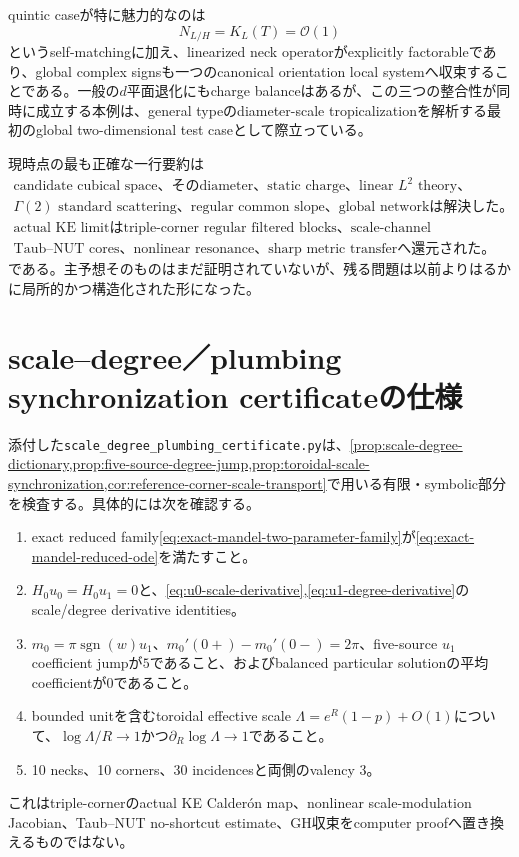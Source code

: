 \documentclass[11pt,a4paper]{ltjsarticle}
\theoremstyle{definition}
\theoremstyle{remark}
\begin{document}
quintic caseが特に魅力的なのは
\[
 N_{L/H}=K_L(T)=\mathcal O(1)
\]
というself-matchingに加え、linearized neck operatorがexplicitly factorableであり、global complex signsも一つのcanonical orientation local systemへ収束することである。一般の$d$平面退化にもcharge balanceはあるが、この三つの整合性が同時に成立する本例は、general typeのdiameter-scale tropicalizationを解析する最初のglobal two-dimensional test caseとして際立っている。

現時点の最も正確な一行要約は
\[
 \boxed{\begin{gathered}
 \text{candidate cubical space、そのdiameter、static charge、linear $L^2$ theory、}\\
 \text{$\Gamma(2)$ standard scattering、regular common slope、global networkは解決した。}\\
 \text{actual KE limitはtriple-corner regular filtered blocks、scale-channel modulation、}\\
 \text{Taub--NUT cores、nonlinear resonance、sharp metric transferへ還元された。}
 \end{gathered}}
\]
である。主予想そのものはまだ証明されていないが、残る問題は以前よりはるかに局所的かつ構造化された形になった。

\appendix

\section{scale--degree／plumbing synchronization certificateの仕様}

添付した\texttt{scale\_degree\_plumbing\_certificate.py}は、\cref{prop:scale-degree-dictionary,prop:five-source-degree-jump,prop:toroidal-scale-synchronization,cor:reference-corner-scale-transport}で用いる有限・symbolic部分を検査する。具体的には次を確認する。
\begin{enumerate}[leftmargin=2.5em]
\item exact reduced family\eqref{eq:exact-mandel-two-parameter-family}が\eqref{eq:exact-mandel-reduced-ode}を満たすこと。
\item $H_0u_0=H_0u_1=0$と、\eqref{eq:u0-scale-derivative},\eqref{eq:u1-degree-derivative}のscale/degree derivative identities。
\item $m_0=\pi\operatorname{sgn}(w)u_1$、$m_0'(0+)-m_0'(0-)=2\pi$、five-source $u_1$ coefficient jumpが$5$であること、およびbalanced particular solutionの平均coefficientが$0$であること。
\item bounded unitを含むtoroidal effective scale $\Lambda=e^R(1-p)+O(1)$について、$\log\Lambda/R\to1$かつ$\partial_R\log\Lambda\to1$であること。
\item 10 necks、10 corners、30 incidencesと両側のvalency $3$。
\end{enumerate}
これはtriple-cornerのactual KE Calder\'on map、nonlinear scale-modulation Jacobian、Taub--NUT no-shortcut estimate、GH収束をcomputer proofへ置き換えるものではない。
\end{document}

